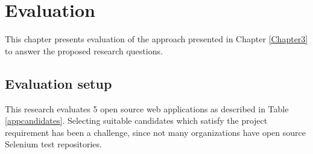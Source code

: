 \chapter{Evaluation} %

\label{Chapter6} %

This chapter presents evaluation of the approach presented in Chapter \ref{Chapter3} to answer the proposed research questions. 

\section{Evaluation setup}
\label{evalsetup}
This research evaluates 5 open source web applications as described in Table \ref{appcandidates}. Selecting suitable candidates which satisfy the project requirement has been a challenge, since not many organizations have open source Selenium test repositories. 


